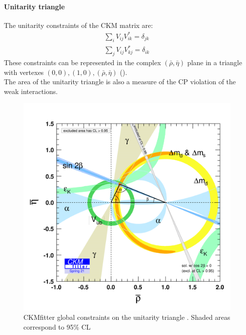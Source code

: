 \paragraph*{Unitarity triangle}
The unitarity constraints of the CKM matrix are:
\begin{gather}
    \sum_i V_{ij}V_{ik}^*=\delta_{jk}\\
    \sum_j V_{ij}V_{kj}^*=\delta_{ik}
\end{gather}
These constraints can be represented in the complex $(\bar{\rho},\bar{\eta})$ plane in a triangle with vertexes $(0,0), (1,0), (\bar{\rho},\bar{\eta})$ ().\\
The area of the unitarity triangle is also a measure of the CP violation of the weak interactions.
\begin{figure}[h]
    \centering
    \includegraphics[width=0.85\linewidth]{fig//chap02-theory/triangle.png}
    \caption{CKMfitter global constraints on the unitarity triangle \cite{CKMfitter}. Shaded areas correspond to 95\% CL}
    \label{fig:triangle}
\end{figure}

